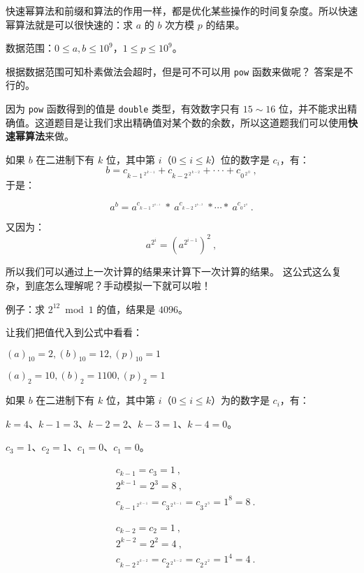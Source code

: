 
快速幂算法和前缀和算法的作用一样，都是优化某些操作的时间复杂度。所以快速幂算法就是可以很快速的：求 $a$ 的 $b$ 次方模 $p$ 的结果。

数据范围：$0 \le a,b \le 10^9$，$1 \le p \le 10^9$。

根据数据范围可知朴素做法会超时，但是可不可以用 \verb|pow| 函数来做呢？
答案是不行的。

因为 \verb|pow| 函数得到的值是 \verb|double| 类型，有效数字只有 $15\sim16$ 位，并不能求出精确值。这道题目是让我们求出精确值对某个数的余数，所以这道题我们可以使用\textbf{快速幂算法}来做。

如果 $b$ 在二进制下有 $k$ 位，其中第 $i$（$0 \le i \le k$）位的数字是 $c_i$，有：
\begin{equation}
b = c_{{k-1}^{\ 2^{\ k-1}}}+c_{{k-2}^{\ 2^{\ k-2}}}+\cdot\cdot\cdot+c_{{0}^{\ 2^{\ 0}}}~,
\end{equation}
于是：

\begin{equation}
a^b= a^{c_{{k-1}^{\ \ 2^{\ k-1}}}} \ *\  a^{c_{{k-2}^{\ \ 2^{\ k-2}}}} \ * \cdots * \ a^{c_{{0}^{\ 2^{\ 0}}}}~.
\end{equation}

又因为：
$$
a^{2^{i}} = (a^{2^{i-1}})^2~,
$$

所以我们可以通过上一次计算的结果来计算下一次计算的结果。
这公式这么复杂，到底怎么理解呢？手动模拟一下就可以啦！

例子：求 $2^{12} \bmod 1$ 的值，结果是 $4096$。

让我们把值代入到公式中看看：

$ (a) _ {10} =  2, (b) _ {10} = 12, (p) _ {10} = 1$

$ (a) _ 2 = 10, (b) _ 2 = 1100, (p) _ 2 = 1 $

如果 $b$ 在二进制下有 $k$ 位，其中第 $i$（$0 \le i \le k$）为的数字是 $c_i$，有：

$k = 4$、$k - 1 = 3$、$k - 2 = 2$、$k - 3 = 1$、$k - 4 = 0$。

$c_3 = 1$、$c_2 = 1$、$c_1 = 0$、$c_1 = 0$。

$$
\begin{aligned}
&c_{k - 1} = c_3 = 1~,\\
&2 ^ {k - 1} = 2 ^ 3 = 8~,\\
&c_{{k-1}^{\ 2^{\ k-1}}} = c_{{3}^{\ 2^{\ k-1}}} = c_{{3}^{\ 2^{\ 3}}} = 1^8 = 8~.
\end{aligned}
$$

$$
\begin{aligned}
&c_{k - 2} = c_2 = 1~,\\
&2 ^ {k - 2} = 2 ^ 2 = 4~,\\
&c_{{k-2}^{\ 2^{\ k-2}}} = c_{{2}^{\ 2^{\ k-2}}} = c_{{2}^{\ 2^{\ 2}}} = 1^4 = 4~.
\end{aligned}
$$

